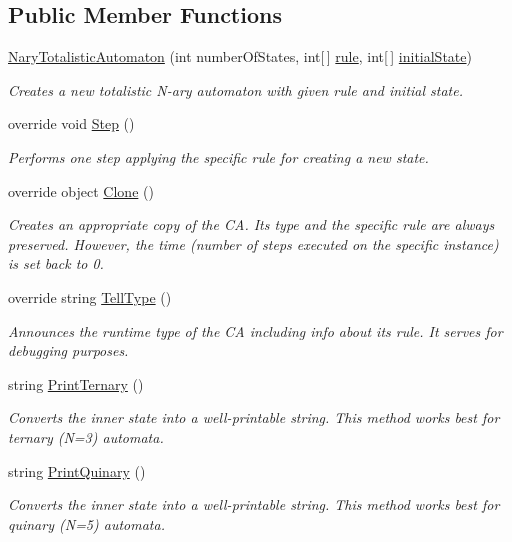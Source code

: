 \subsection*{Public Member Functions}
\begin{DoxyCompactItemize}
\item 
\hyperlink{class_cellular_1_1_nary_totalistic_automaton_aafe92ae99ccbb3591b128d6e720227f6}{Nary\+Totalistic\+Automaton} (int number\+Of\+States, int\mbox{[}$\,$\mbox{]} \hyperlink{class_cellular_1_1_nary_totalistic_automaton_a878c767c6823bd8ed8dc0f7d2ccb1fd2}{rule}, int\mbox{[}$\,$\mbox{]} \hyperlink{all__1_8js_ae8b87ff4be2ae1dd5267342795263360}{initial\+State})
\begin{DoxyCompactList}\small\item\em Creates a new totalistic N-\/ary automaton with given rule and initial state. \end{DoxyCompactList}\item 
override void \hyperlink{class_cellular_1_1_nary_totalistic_automaton_ad90769a438ab94b46d4750a571782056}{Step} ()
\begin{DoxyCompactList}\small\item\em Performs one step applying the specific rule for creating a new state. \end{DoxyCompactList}\item 
override object \hyperlink{class_cellular_1_1_nary_totalistic_automaton_a13f16113915ecec451fc4764a32044f9}{Clone} ()
\begin{DoxyCompactList}\small\item\em Creates an appropriate copy of the C\+A. Its type and the specific rule are always preserved. However, the time (number of steps executed on the specific instance) is set back to 0. \end{DoxyCompactList}\item 
override string \hyperlink{class_cellular_1_1_nary_totalistic_automaton_aa691c532a55638c7e3d0c125a4244773}{Tell\+Type} ()
\begin{DoxyCompactList}\small\item\em Announces the runtime type of the C\+A including info about its rule. It serves for debugging purposes. \end{DoxyCompactList}\item 
string \hyperlink{class_cellular_1_1_nary_totalistic_automaton_a239c8e21ae35741c4baadb96be21cec9}{Print\+Ternary} ()
\begin{DoxyCompactList}\small\item\em Converts the inner state into a well-\/printable string. This method works best for ternary (N=3) automata. \end{DoxyCompactList}\item 
string \hyperlink{class_cellular_1_1_nary_totalistic_automaton_aa9d5e154d625d8a8884221df45766145}{Print\+Quinary} ()
\begin{DoxyCompactList}\small\item\em Converts the inner state into a well-\/printable string. This method works best for quinary (N=5) automata. \end{DoxyCompactList}\end{DoxyCompactItemize}
